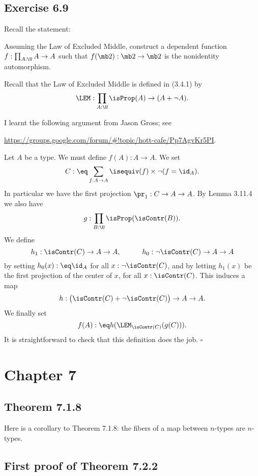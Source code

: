 \documentclass[12pt]{article}
\begin{document}

\subsection{Exercise 6.9}


Recall the statement:

Assuming the Law of Excluded Middle, construct a dependent function $f:\prod_{A:\U}A\to A$ such that $f(\mb2):\mb2\to\mb2$ is the nonidentity automorphism.

Recall that the Law of Excluded Middle is defined in (3.4.1) by 
$$
\LEM:\prod_{A:\U}\isProp(A)\to(A+\neg A).
$$ 

I learnt the following argument from Jason Gross; see 

\nn\href{https://groups.google.com/forum/#!topic/hott-cafe/Pp7AgvKr5PI}{https://groups.google.com/forum/\#!topic/hott-cafe/Pp7AgvKr5PI}.

Let $A$ be a type. We must define $f(A):A\to A$. We set 
$$
C:\eq\sum_{f:A\to A}\isequiv(f)\times\neg(f=\id_A).
$$ 
In particular we have the first projection $\pr_1:C\to A\to A$. By Lemma 3.11.4 we also have 
$$
g:\prod_{B:\U}\isProp(\isContr(B)).
$$ 
We define 
$$
h_1:\isContr(C)\to A\to A,\qquad\quad h_0:\neg\isContr(C)\to A\to A
$$ 
by setting $h_0(x):\eq\id_A$ for all $x:\neg\isContr(C)$, and by letting $h_1(x)$ be the first projection of the center of $x$, for all $x:\isContr(C)$. This induces a map 
$$
h:\big(\isContr(C)+\neg\isContr(C)\big)\to A\to A.
$$ 
We finally set 
$$
f(A):\eq h(\LEM_{\isContr(C)}(g(C))).
$$
It is straightforward to check that this definition does the job. $\square$


\section{Chapter 7}


\subsection{Theorem 7.1.8}\label{718}

Here is a corollary to Theorem 7.1.8: the fibers of a map between $n$-types are $n$-types.


\subsection{First proof of Theorem 7.2.2}
\end{document}
